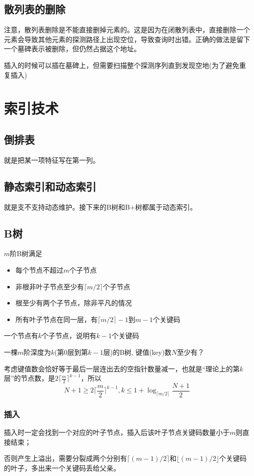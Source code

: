 \documentclass[8pt]{article}
\begin{document}
\subsection{散列表的删除}
注意，散列表删除是不能直接删掉元素的。这是因为在闭散列表中，直接删除一个元素会导致其他元素的探测路径上出现空位，导致查询时出错。正确的做法是留下一个墓碑表示被删除，但仍然占据这个地址。

插入的时候可以插在墓碑上，但需要扫描整个探测序列直到发现空地(为了避免重复插入)
\section{索引技术}
\subsection{倒排表}
就是把某一项特征写在第一列。
\subsection{静态索引和动态索引}
就是支不支持动态维护。接下来的B树和B+树都属于动态索引。
\subsection{B树}
$m$阶B树满足
\begin{itemize}
	\item 每个节点不超过$m$个子节点
	\item 非根非叶子节点至少有$\lceil m/2 \rceil$个子节点
	\item 根至少有两个子节点，除非平凡的情况
	\item 所有叶子节点在同一层，有$\lceil m/2 \rceil - 1$到$m - 1$个关键码
\end{itemize}

一个节点有$k$个子节点，说明有$k-1$个关键码

一棵$m$阶深度为$k$(第$0$层到第$k-1$层)的B树, 键值(key)数$N$至少有？

考虑键值数会恰好等于最后一层连出去的空指针数量减一，也就是“理论上的第$k$层”的节点数，是$2\lceil \frac m2 \rceil^{k-1}$，所以$$N + 1 \ge 2\lceil \frac m2 \rceil^{k-1}, k \le 1 + \log_{\lceil m / 2 \rceil}\frac{N+1}{2}$$
\subsubsection{插入}
插入时一定会找到一个对应的叶子节点，插入后该叶子节点关键码数量小于$m$则直接结束；

否则产生上溢出，需要分裂成两个分别有$\lceil (m-1)/2 \rceil$和$\lfloor (m-1)/2 \rfloor$个关键码的叶子，多出来一个关键码丢给父亲。
\end{document}
